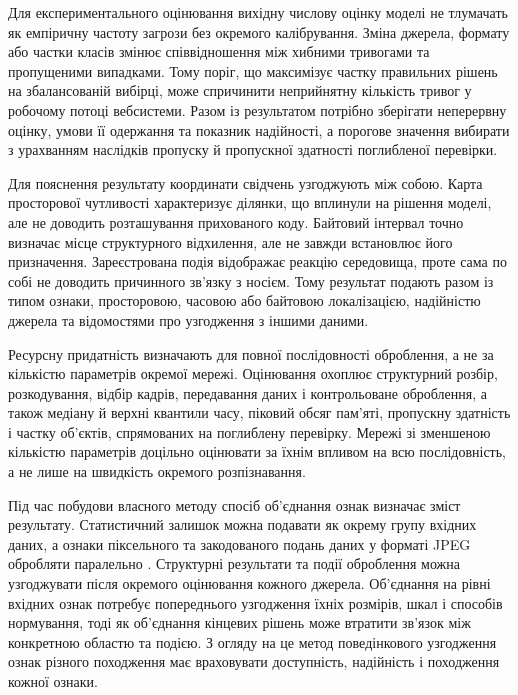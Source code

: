 Для експериментального оцінювання вихідну числову оцінку моделі не тлумачать як емпіричну частоту загрози без окремого калібрування. Зміна джерела, формату або частки класів змінює співвідношення між хибними тривогами та пропущеними випадками. Тому поріг, що максимізує частку правильних рішень на збалансованій вибірці, може спричинити неприйнятну кількість тривог у робочому потоці вебсистеми. Разом із результатом потрібно зберігати неперервну оцінку, умови її одержання та показник надійності, а порогове значення вибирати з урахванням наслідків пропуску й пропускної здатності поглибленої перевірки.

Для пояснення результату координати свідчень узгоджують між собою. Карта просторової чутливості характеризує ділянки, що вплинули на рішення моделі, але не доводить розташування прихованого коду. Байтовий інтервал точно визначає місце структурного відхилення, але не завжди встановлює його призначення. Зареєстрована подія відображає реакцію середовища, проте сама по собі не доводить причинного зв’язку з носієм. Тому результат подають разом із типом ознаки, просторовою, часовою або байтовою локалізацією, надійністю джерела та відомостями про узгодження з іншими даними.

Ресурсну придатність визначають для повної послідовності оброблення, а не за кількістю параметрів окремої мережі. Оцінювання охоплює структурний розбір, розкодування, відбір кадрів, передавання даних і контрольоване оброблення, а також медіану й верхні квантили часу, піковий обсяг пам’яті, пропускну здатність і частку об’єктів, спрямованих на поглиблену перевірку. Мережі зі зменшеною кількістю параметрів \cite{weng2022lwenet,hong2023blockpruning} доцільно оцінювати за їхнім впливом на всю послідовність, а не лише на швидкість окремого розпізнавання.

Під час побудови власного методу спосіб об’єднання ознак визначає зміст результату. Статистичний залишок можна подавати як окрему групу вхідних даних, а ознаки піксельного та закодованого подань даних у форматі JPEG обробляти паралельно \cite{he2025twobranch}. Структурні результати та події оброблення можна узгоджувати після окремого оцінювання кожного джерела. Об’єднання на рівні вхідних ознак потребує попереднього узгодження їхніх розмірів, шкал і способів нормування, тоді як об’єднання кінцевих рішень може втратити зв’язок між конкретною областю та подією. З огляду на це метод поведінкового узгодження ознак різного походження має враховувати доступність, надійність і походження кожної ознаки.

